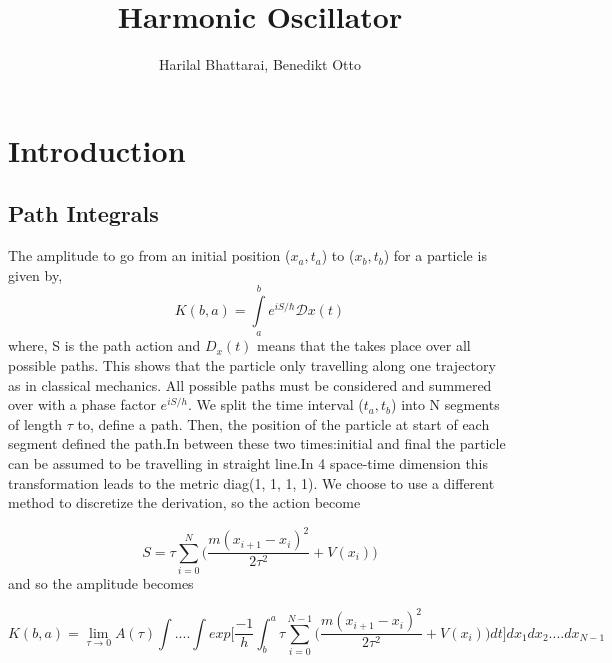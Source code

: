 \documentclass{article}
\title{Harmonic Oscillator}
\author{Harilal Bhattarai, Benedikt Otto}
\begin{document}
	\maketitle
	\newpage
	\begin{abstract}
	\end{abstract}
	\section{Introduction}

\subsection{Path Integrals}
The amplitude to go from an initial position ($x_a, t_a$) to ($x_b, t_b$) for a particle is given by,
\begin{equation}
K(b,a)= \int\limits_{a}^{b} e^{iS/\hbar} \mathcal{D}x(t)
\end{equation}
where, S is the path action and $D_x(t)$ means that the takes place over all possible paths. 
This shows that the particle only travelling along one trajectory as in classical mechanics. All possible paths must be considered and summered over with a phase factor $e^{iS/h}$. We split the time interval ($t_a, t_b$) into N segments of length $\tau$ to, define a path. Then, the position of the particle at start of each segment defined the path.In between these two times:initial and final the particle can be assumed to be travelling in straight line.In 4 space-time dimension this transformation leads to the metric diag(1, 1, 1, 1).
We choose to use a different method to discretize the derivation, so the action become

\begin{equation}
S= \tau\sum_{i=0}^{N}\bigg( \frac{ m(x_{i+1} -x_i)^2}{2\tau^2} + V(x_i)\bigg)
\end{equation} 
 and so the amplitude becomes

\begin{equation}
K(b,a)=\lim_{\tau \to 0} A(\tau) \int....\int exp \bigg[\frac{-1}{h} \int_{b}^{a} \tau \sum_{i=0}^{N-1} \bigg( \frac{m(x_{i+1} - x_i)^2}{2\tau^2} +V(x_i)\bigg)dt \bigg]dx_1 dx_2....dx_{N-1}
\end{equation}
\end{document}
